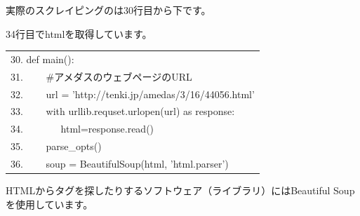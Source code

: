 \documentclass[text08.tex]{subfiles}
\begin{document}
\bigskip

\clearpage
実際のスクレイピングのは30行目から下です。

34行目でhtmlを取得しています。





\begin{table}[htbp]
    \centering
    \begin{tabular}{|l|}
        \hline
        
        30. def main():\\
        31. \ \ \ \ \#アメダスのウェブページのURL\\
        32. \ \ \ \ url = 'http://tenki.jp/amedas/3/16/44056.html'\\
        33. \ \ \ \ with urllib.requset.urlopen(url) as response:\\
        34. \ \ \ \ \ \ \ html=response.read()\\
        35. \ \ \ \ parse\_opts()\\
        36. \ \ \ \ soup = BeautifulSoup(html, 'html.parser')\\
        
        \hline
    \end{tabular}
\end{table}


HTMLからタグを探したりするソフトウェア（ライブラリ）にはBeautiful
Soupを使用しています。
\end{document}
